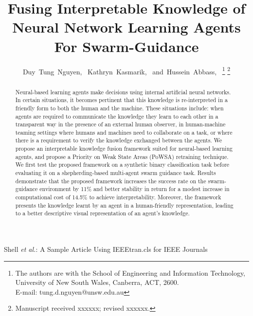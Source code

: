 \documentclass[lettersize,journal]{IEEEtran}
\begin{document}
\title{Fusing Interpretable Knowledge of Neural Network Learning Agents For Swarm-Guidance}
\author{Duy~Tung~Nguyen,~
        Kathryn~Kasmarik,~
        and~Hussein~Abbass,~%
\thanks{The authors are with the School of Engineering and Information Technology, University of New South Wales, Canberra, ACT, 2600.\protect\\
E-mail: tung.d.nguyen@unsw.edu.au}%
\thanks{Manuscript received xxxxxx; revised xxxxxx.}}
%
{Shell \MakeLowercase{\textit{et al.}}: A Sample Article Using IEEEtran.cls for IEEE Journals}


\maketitle

\begin{abstract}
Neural-based learning agents make decisions using internal artificial neural networks. In certain situations, it becomes pertinent that this knowledge is re-interpreted in a friendly form to both the human and the machine. These situations include: when agents are required to communicate the knowledge they learn to each other in a transparent way in the presence of an external human observer, in human-machine teaming settings where humans and machines need to collaborate on a task, or where there is a requirement to verify the knowledge exchanged between the agents. We propose an interpretable knowledge fusion framework suited for neural-based learning agents, and propose a Priority on Weak State Areas (PoWSA) retraining technique. We first test the proposed framework on a synthetic binary classification task before evaluating it on a shepherding-based multi-agent swarm guidance task. Results demonstrate that the proposed framework increases the success rate on the swarm-guidance environment by 11\% and better stability in return for a modest increase in computational cost of 14.5\% to achieve interpretability. Moreover, the framework presents the knowledge learnt by an agent in a human-friendly representation, leading to a better descriptive visual representation of an agent\textquoteright s knowledge.
\end{abstract}
\end{document}
